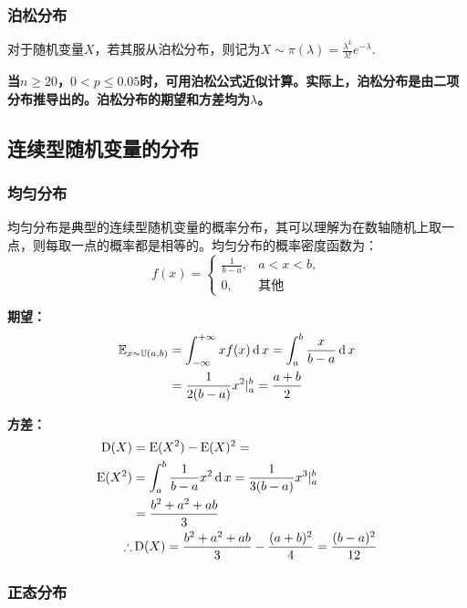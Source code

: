 \documentclass[12pt,a4paper]{article}
\begin{document}
  \subsubsection{泊松分布}
  对于随机变量$X$，若其服从泊松分布，则记为$X\sim \pi(\lambda)=\frac{\lambda ^k}{\lambda !}e^{-\lambda}$. 

  \textbf{当$n\geq 20$，$0<p\leq 0.05$时，可用泊松公式近似计算。实际上，泊松分布是由二项分布推导出的。泊松分布的期望和方差均为$\lambda$。}

  \subsection{连续型随机变量的分布}

  \subsubsection{均匀分布}
  均匀分布是典型的连续型随机变量的概率分布，其可以理解为在数轴随机上取一点，则每取一点的概率都是相等的。均匀分布的概率密度函数为：
  $$
  f(x)=\left\{
    \begin{array}{cl}
      \frac{1}{b-a}, &a < x < b,\\
      0, & \text{其他}
    \end{array}
    \right.
  $$

  \textbf{期望：}
  $$
  \begin{aligned}
    \mathbb{E}_{x\sim \mathbb{U}(a,b)} &= \int_{-\infty}^{+\infty} x f(x) \operatorname{d}x = \int_{a}^b \frac{x}{b-a} \operatorname{d}x \\ 
    &= \frac{1}{2(b-a)} x^2 \arrowvert_a^b=\frac{a+b}{2}
  \end{aligned}
  $$

  \textbf{方差：}
  $$
  \begin{aligned}
    \operatorname{D}(X) &= \operatorname{E}(X^2) - \operatorname{E}(X)^2 = \\
    \operatorname{E}(X^2) &= \int_a^b \frac{1}{b-a}x^2 \operatorname{d}x = \frac{1}{3(b-a)}x^3 \arrowvert_a^b \\ 
    &= \frac{b^2+a^2+ab}{3} \\ 
    \therefore & \operatorname{D}(X) = \frac{b^2+a^2+ab}{3} - \frac{(a+b)^2}{4} = \frac{(b-a)^2}{12}
  \end{aligned}
  $$

  \subsubsection{正态分布}
\end{document}
